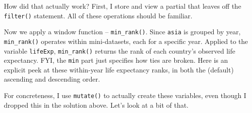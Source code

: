 \documentclass[
]{book}
\newenvironment{Shaded}{\begin{snugshade}}{\end{snugshade}}
\newcommand{\CommentTok}[1]{\textcolor[rgb]{0.56,0.35,0.01}{\textit{#1}}}
\newcommand{\KeywordTok}[1]{\textcolor[rgb]{0.13,0.29,0.53}{\textbf{#1}}}
\newcommand{\NormalTok}[1]{#1}
\newcommand{\OperatorTok}[1]{\textcolor[rgb]{0.81,0.36,0.00}{\textbf{#1}}}
\newcommand{\StringTok}[1]{\textcolor[rgb]{0.31,0.60,0.02}{#1}}
\begin{document}
How did that actually work? First, I store and view a partial that leaves off the \texttt{filter()} statement. All of these operations should be familiar.

\begin{Shaded}
\end{Shaded}

Now we apply a window function -- \texttt{min\_rank()}. Since \texttt{asia} is grouped by year, \texttt{min\_rank()} operates within mini-datasets, each for a specific year. Applied to the variable \texttt{lifeExp}, \texttt{min\_rank()} returns the rank of each country's observed life expectancy. FYI, the \texttt{min} part just specifies how ties are broken. Here is an explicit peek at these within-year life expectancy ranks, in both the (default) ascending and descending order.

For concreteness, I use \texttt{mutate()} to actually create these variables, even though I dropped this in the solution above. Let's look at a bit of that.
\end{document}
